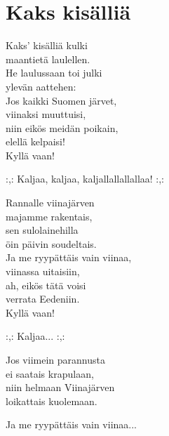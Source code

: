 \section{Kaks kisälliä}

Kaks’ kisälliä kulki\\
maantietä laulellen.\\
He laulussaan toi julki\\
ylevän aattehen:\\
Jos kaikki Suomen järvet, \\
viinaksi muuttuisi,\\
niin eikös meidän poikain,\\
elellä kelpaisi!\\
Kyllä vaan!

:,: Kaljaa, kaljaa, kaljallallallallaa! :,:

Rannalle viinajärven\\
majamme rakentais,\\
sen sulolainehilla\\
öin päivin soudeltais. \\
Ja me ryypättäis vain viinaa, \\
viinassa uitaisiin, \\
ah, eikös tätä voisi \\
verrata Eedeniin. \\
Kyllä vaan!

:,: Kaljaa... :,:

Jos viimein parannusta \\
ei saatais krapulaan, \\
niin helmaan Viinajärven\\
loikattais kuolemaan.

Ja me ryypättäis vain viinaa...